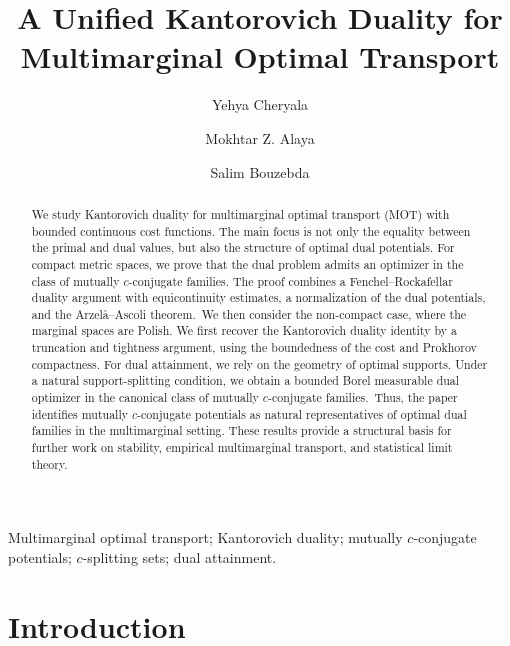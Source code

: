 \documentclass[twoside,11pt,a4paper]{article}
\begin{document}
\title{A Unified Kantorovich Duality for Multimarginal Optimal Transport}

\author[1]{Yehya Cheryala}
\author[1]{Mokhtar Z. Alaya}
\author[1]{Salim Bouzebda}

\maketitle




\begin{abstract}
We study Kantorovich duality for multimarginal optimal transport (MOT) with bounded
continuous cost functions. The main focus is not only the equality between the
primal and dual values, but also the structure of optimal dual potentials. For
compact metric spaces, we prove that the dual problem admits an optimizer in the
class of mutually $c$-conjugate families. The proof combines a
Fenchel--Rockafellar duality argument with equicontinuity estimates, a
normalization of the dual potentials, and the Arzelà--Ascoli theorem. We then consider the non-compact case, where the marginal spaces are Polish. We
first recover the Kantorovich duality identity by a truncation and tightness
argument, using the boundedness of the cost and Prokhorov compactness. For dual
attainment, we rely on the geometry of optimal supports. Under a natural
support-splitting condition, we obtain a bounded Borel measurable dual optimizer
in the canonical class of mutually $c$-conjugate families. Thus, the paper identifies mutually $c$-conjugate potentials as natural
representatives of optimal dual families in the multimarginal setting. These
results provide a structural basis for further work on stability, empirical
multimarginal transport, and statistical limit theory.
\end{abstract}


\begin{keywords}
Multimarginal optimal transport; Kantorovich duality; mutually \(c\)-conjugate potentials; \(c\)-splitting sets;
dual attainment.
\end{keywords}




\section{Introduction}\label{sec:intro}
\end{document}
